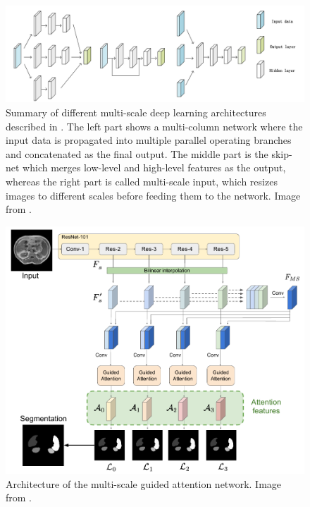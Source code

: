 \begin{figure}[H]%
    \centering
    \includegraphics[width=\imgWidthXL]{images/multi_scale_deep_learning.png}
    \caption[Multi-scale processing architectures]{Summary of different multi-scale deep learning architectures described in \cite{10.1007/s10489-018-1150-1}. The left part shows a multi-column network where the input data is propagated into multiple parallel operating branches and concatenated as the final output. The middle part is the skip-net which merges low-level and high-level features as the output, whereas the right part is called multi-scale input, which resizes images to different scales before feeding them to the network. Image from \cite{10.1007/s10489-018-1150-1}.}
    \label{multi_scale_deep_learning}
\end{figure}

\begin{figure}[H]%
    \centering
    \includegraphics[width=\imgWidthXL]{images/multi_scale_self_guided_attention.png}
    \caption[Multi-scale attention network]{Architecture of the multi-scale guided attention network. Image from \cite{9066969}.}
    \label{multi_scale_self_guided_attention}
\end{figure}

